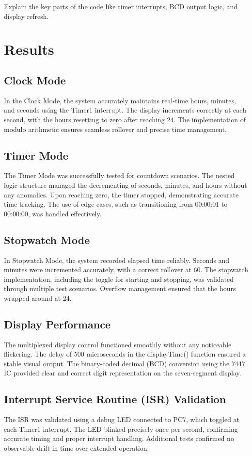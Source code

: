 \documentclass[journal]{IEEEtran}
\begin{document}
Explain the key parts of the code like timer interrupts, BCD output logic, and display refresh.

\section{Results}

\subsection{Clock Mode}
In the Clock Mode, the system accurately maintains real-time hours, minutes, and seconds using the Timer1 interrupt. The display increments correctly at each second, with the hours resetting to zero after reaching 24. The implementation of modulo arithmetic ensures seamless rollover and precise time management.

\subsection{Timer Mode}
The Timer Mode was successfully tested for countdown scenarios. The nested logic structure managed the decrementing of seconds, minutes, and hours without any anomalies. Upon reaching zero, the timer stopped, demonstrating accurate time tracking. The use of edge cases, such as transitioning from 00:00:01 to 00:00:00, was handled effectively.

\subsection{Stopwatch Mode}
In Stopwatch Mode, the system recorded elapsed time reliably. Seconds and minutes were incremented accurately, with a correct rollover at 60. The stopwatch implementation, including the toggle for starting and stopping, was validated through multiple test scenarios. Overflow management ensured that the hours wrapped around at 24.

\subsection{Display Performance}
The multiplexed display control functioned smoothly without any noticeable flickering. The delay of 500 microseconds in the displayTime() function ensured a stable visual output. The binary-coded decimal (BCD) conversion using the 7447 IC provided clear and correct digit representation on the seven-segment display.

\subsection{Interrupt Service Routine (ISR) Validation}
The ISR was validated using a debug LED connected to PC7, which toggled at each Timer1 interrupt. The LED blinked precisely once per second, confirming accurate timing and proper interrupt handling. Additional tests confirmed no observable drift in time over extended operation.
\end{document}
